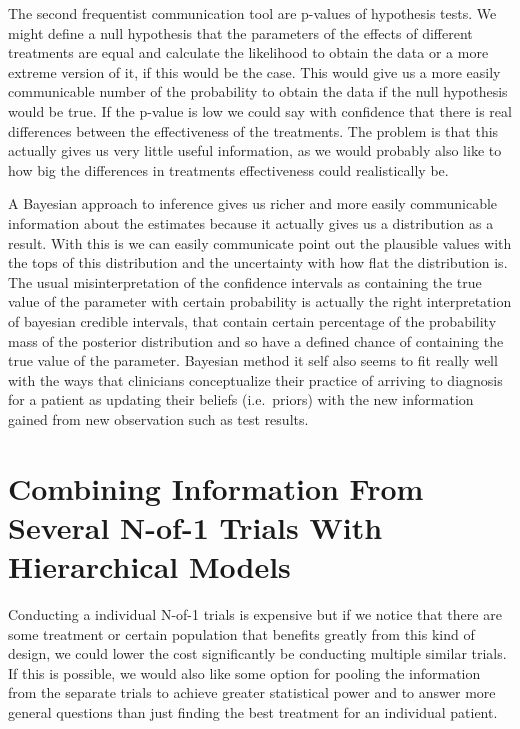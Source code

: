 \documentclass[12pt,a4paper,leqno]{report}
\theoremstyle{plain}
\theoremstyle{definition}
\theoremstyle{remark}
\begin{document}
The second frequentist communication tool are p-values of hypothesis tests. We might
define a null hypothesis that the parameters of the effects of different treatments are
equal and calculate the likelihood to obtain the data or a more extreme version of it, if
this would be the case. This would give us a more easily communicable number of the
probability to obtain the data if the null hypothesis would be true. If the p-value is
low we could say with confidence that there is real differences between the effectiveness
of the treatments. The problem is that this actually gives us very little useful
information, as we would probably also like to how big the differences in treatments
effectiveness could realistically be.

A Bayesian approach to inference gives us richer and more easily communicable information
about the estimates because it actually gives us a distribution as a result. With this is
we can easily communicate point out the plausible values with the tops of this
distribution and the uncertainty with how flat the distribution is. The usual
misinterpretation of the confidence intervals as containing the true value of the
parameter with certain probability is actually the right interpretation of bayesian
credible intervals, that contain certain percentage of the probability mass of the
posterior distribution and so have a defined chance of containing the true value of the
parameter. Bayesian method it self also seems to fit really well with the ways that
clinicians conceptualize their practice of arriving to  diagnosis for a patient as
updating their beliefs (i.e.\ priors) with the new information gained from new
observation such as test results\cite{clinbayes}.

\chapter{Combining Information From Several N-of-1 Trials With Hierarchical
  Models}\label{hierarchicalbayes}

Conducting a individual N-of-1 trials is expensive but if we notice that there are some
treatment or certain population that benefits greatly from this kind of design, we could
lower the cost significantly be conducting multiple similar trials. If this is possible,
we would also like some option for pooling the information from the separate trials to
achieve greater statistical power and to answer more general questions than just finding
the best treatment for an individual patient.
\end{document}
